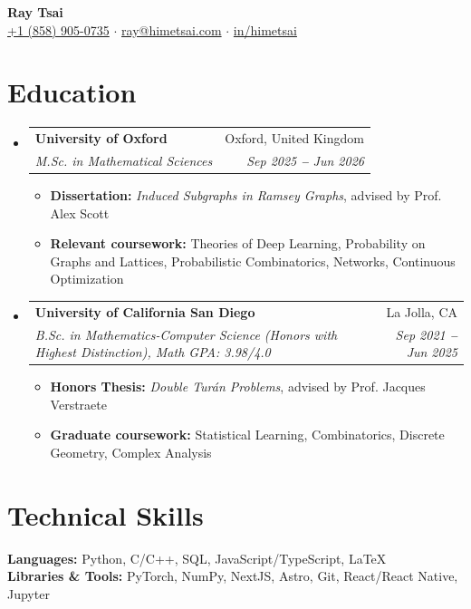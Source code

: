 \documentclass[letterpaper,11pt]{article}
\makeatletter
\newcommand{\resumeItem}[1]{
  \item\small{
    {#1 \vspace{-1pt}}
  }
}
\newcommand{\resumeEducationHeading}[4]{
  \vspace{-2pt}\item
    \begin{tabular*}{0.97\textwidth}[t]{l@{\extracolsep{\fill}}r}
      \textbf{#1} & #2 \\
      \textit{\small#3} & \textit{\small #4} \\
    \end{tabular*}\vspace{-5pt}
}
\newcommand{\resumeSubHeadingListStart}{\begin{itemize}[leftmargin=0.15in, label={}]}
\newcommand{\resumeSubHeadingListEnd}{\end{itemize}}
\newcommand{\resumeItemListStart}{\begin{itemize}\vspace{-2pt}}
\newcommand{\resumeItemListEnd}{\end{itemize}\vspace{-7pt}}
\makeatother
\begin{document}

\begin{center}
  \textbf{\Huge Ray Tsai} \\
  \vspace{8pt}
  \small
  \faMobile \hspace{.5pt} \href{tel:18589050735}{+1 (858) 905-0735}
  $\cdot$
  \faAt \hspace{.5pt} \href{mailto:ray@himetsai.com}{ray@himetsai.com}
  $\cdot$
  \faLinkedinSquare \hspace{.5pt} \href{https://www.linkedin.com/in/himetsai}{in/himetsai}
\end{center}


\section{Education}
\resumeSubHeadingListStart
  \resumeEducationHeading{University of Oxford}{Oxford, United Kingdom}{M.Sc. in Mathematical Sciences}{Sep 2025 \textbf{--} Jun 2026}
  \resumeItemListStart
    \resumeItem{\textbf{Dissertation:} \textit{Induced Subgraphs in Ramsey Graphs}, advised by Prof. Alex Scott}
    \resumeItem{\textbf{Relevant coursework:} Theories of Deep Learning, Probability on Graphs and Lattices, Probabilistic Combinatorics, Networks, Continuous Optimization}
  \resumeItemListEnd

  \resumeEducationHeading{University of California San Diego}{La Jolla, CA}{B.Sc. in Mathematics-Computer Science (Honors with Highest Distinction), Math GPA: 3.98/4.0}{Sep 2021 \textbf{--} Jun 2025}
  \resumeItemListStart
    \resumeItem{\textbf{Honors Thesis:} \textit{Double Turán Problems}, advised by Prof. Jacques Verstraete}
    \resumeItem{\textbf{Graduate coursework:} Statistical Learning, Combinatorics, Discrete Geometry, Complex Analysis}
  \resumeItemListEnd
\resumeSubHeadingListEnd


\section{Technical Skills}
\resumeSubHeadingListStart
  \small{\item{
    \textbf{Languages:} Python, C/C++, SQL, JavaScript/TypeScript, \LaTeX \\
    \textbf{Libraries \& Tools:} PyTorch, NumPy, NextJS, Astro, Git, React/React Native, Jupyter
  }}
\resumeSubHeadingListEnd
\end{document}

